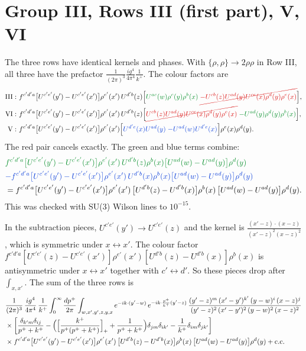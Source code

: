 \documentclass[10pt]{article}
\newcommand{\R}[1]{{\color{cR}#1}}
\newcommand{\B}[1]{{\color{cB}#1}}
\newcommand{\G}[1]{{\color{cG}#1}}
\begin{document}
\section{Group III, Rows III (first part), V, VI}
The three rows have identical kernels and phases. With $\{\rho,\rho\}\to2\rho\rho$ in Row III, all three have the prefactor $\frac{1}{(2\pi)^{3}}\frac{ig^{4}}{4\pi^{4}}\frac{1}{k^{+}}$. The colour factors are
\begin{align}
\text{III}:\ &f^{c'd'a}\big[U^{c'e'}(y')-U^{c'e'}(x')\big]\rho^{e'}(x')\,U^{d'b}(z)\Big[\G{U^{ac}(w)\rho^{c}(y)\rho^{b}(x)}\;\R{\cancel{-U^{cb}(z)U^{ad}(y)U^{ce}(x)\rho^{d}(y)\rho^{e}(x)}}\Big],\notag\\
\text{VI}:\ &f^{c'd'a}\big[U^{c'e'}(y')-U^{c'e'}(x')\big]\rho^{e'}(x')\,U^{d'b}(z)\Big[\R{\cancel{U^{cb}(z)U^{ad}(y)U^{ce}(x)\rho^{d}(y)\rho^{e}(x)}}\;\G{-U^{ad}(y)\rho^{d}(y)\rho^{b}(x)}\Big],\notag\\
\text{V}:\ &f^{c'd'a}\big[U^{c'e'}(y')-U^{c'e'}(x')\big]\rho^{e'}(x')\Big[\B{U^{d'e}(x)U^{ad}(y)}\;\B{-U^{ad}(w)U^{d'e}(x)}\Big]\rho^{e}(x)\rho^{d}(y).
\end{align}
The \R{red} pair cancels exactly. The \G{green} and \B{blue} terms combine:
\begin{align}
&\G{f^{c'd'a}\big[U^{c'e'}(y')-U^{c'e'}(x')\big]\rho^{e'}(x')\,U^{d'b}(z)\rho^{b}(x)\big[U^{ad}(w)-U^{ad}(y)\big]\rho^{d}(y)}\notag\\
&\B{-f^{c'd'a}\big[U^{c'e'}(y')-U^{c'e'}(x')\big]\rho^{e'}(x')\,U^{d'b}(x)\rho^{b}(x)\big[U^{ad}(w)-U^{ad}(y)\big]\rho^{d}(y)}\notag\\
&=f^{c'd'a}\big[U^{c'e'}(y')-U^{c'e'}(x')\big]\rho^{e'}(x')\,\big[U^{d'b}(z)-U^{d'b}(x)\big]\rho^{b}(x)\,\big[U^{ad}(w)-U^{ad}(y)\big]\rho^{d}(y).
\end{align}
This was checked with SU(3) Wilson lines to $10^{-15}$.

In the subtraction pieces, $U^{c'e'}(y')\to U^{c'e'}(z)$ and the kernel is $\frac{(x'-z)\cdot(x-z)}{(x'-z)^{2}(x-z)^{2}}$, which is symmetric under $x\leftrightarrow x'$. The colour factor $f^{c'd'a}[U^{c'e'}(z)-U^{c'e'}(x')]\rho^{e'}(x')[U^{d'b}(z)-U^{d'b}(x)]\rho^{b}(x)$ is antisymmetric under $x\leftrightarrow x'$ together with $c'\leftrightarrow d'$. So these pieces drop after $\int_{x,x'}$. The sum of the three rows is
\begin{align}
&\frac{1}{(2\pi)^{3}}\,\frac{ig^{4}}{4\pi^{4}}\,\frac{1}{k^{+}}\int_{0}^{\infty}\frac{dp^{+}}{2\pi}\int_{w,x',y',z,y,x}e^{-ik\cdot(y'-w)}\,e^{-ik\cdot\frac{p^{+}}{k^{+}}(y'-z)}\,\frac{(y'-z)^{m}\,(x'-y')^{k'}\,(y-w)^{i}\,(x-z)^{j}}{(y'-z)^{2}\,(x'-y')^{2}\,(y-w)^{2}\,(x-z)^{2}}\notag\\
&\times\bigg[\frac{\delta_{k'm}\delta_{ij}}{p^{+}+k^{+}}-\Big(\Big[\frac{k^{+}}{p^{+}(p^{+}+k^{+})}\Big]_{+}+\frac{1}{p^{+}+k^{+}}\Big)\delta_{jm}\delta_{ik'}-\frac{1}{k^{+}}\delta_{im}\delta_{jk'}\bigg]\notag\\
&\times f^{c'd'a}\big[U^{c'e'}(y')-U^{c'e'}(x')\big]\rho^{e'}(x')\,\big[U^{d'b}(z)-U^{d'b}(x)\big]\rho^{b}(x)\,\big[U^{ad}(w)-U^{ad}(y)\big]\rho^{d}(y)+{\rm c.c.}
\end{align}
\end{document}
